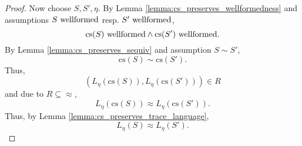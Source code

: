 \documentclass{llncs}
\newcommand*{\bisim}{\approx}
\newcommand*{\cs}{\mathrm{cs}}
\newcommand*{\sequiv}{\sim}
\newcommand*{\wf}[1]{\text{$#1$ {\normalfont \rmfamily wellformed}}}
\renewcommand*{\|}{\;|\;}
\begin{document}
\begin{proof}
  Now choose $S, S', \eta$. By Lemma \ref{lemma:cs_preserves_wellformedness}
  and assumptions $\wf{S}$ resp. $\wf{S'}$,
  \begin{equation*}
    \wf{\cs(S)} \land \wf{\cs(S')}.
  \end{equation*}
  By Lemma \ref{lemma:cs_preserves_sequiv} and assumption $S \sequiv S'$,
  \begin{equation*}
    \cs(S) \sequiv \cs(S').
  \end{equation*}
  Thus,
  \begin{equation*}
    (L_\eta(\cs(S)), L_\eta(\cs(S'))) \in R
  \end{equation*}
  and due to $R \subseteq \bisim$,
  \begin{equation*}
    L_\eta(\cs(S)) \bisim L_\eta(\cs(S')).
  \end{equation*}
  Thus, by Lemma \ref{lemma:cs_preserves_trace_language},
  \begin{equation*}
    L_\eta(S) \bisim L_\eta(S').
  \end{equation*}
\end{proof}
\end{document}
